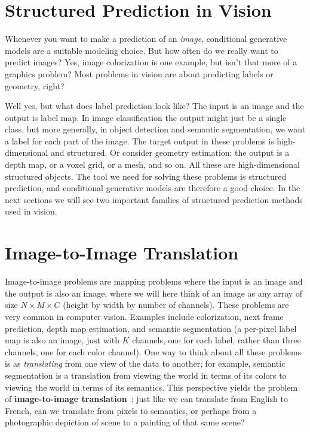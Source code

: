 \section{Structured Prediction in Vision}
Whenever you want to make a prediction of an \textit{image}, conditional generative models are a suitable modeling choice. But how often do we really want to predict images? Yes, image colorization is one example, but isn't that more of a graphics problem? Most problems in vision are about predicting labels or geometry, right?

Well yes, but what does label prediction look like? The input is an image and the output is label map. In image classification the output might just be a single class, but more generally, in object detection and semantic segmentation, we want a label for each part of the image. The target output in these problems is high-dimensional and structured. Or consider geometry estimation: the output is a depth map, or a voxel grid, or a mesh, and so on. All these are high-dimensional structured objects. The tool we need for solving these problems is structured prediction, and conditional generative models are therefore a good choice. In the next sections we will see two important families of structured prediction methods used in vision.

\section{Image-to-Image Translation}\label{sec:conditional_generative_models:im2im}

Image-to-image problems are mapping problems where the input is an image and the output is also an image, where we will here think of an image as any array of size $N \times M \times C$ (height by width by number of channels). These problems are very common in computer vision. Examples include colorization, next frame prediction, depth map estimation, and semantic segmentation (a per-pixel label map is also an image, just with $K$ channels, one for each label, rather than three channels, one for each color channel). One way to think about all these problems is as \textit{translating} from one view of the data to another; for example, semantic segmentation is a translation from viewing the world in terms of its colors to viewing the world in terms of its semantics. This perspective yields the problem of \textbf{image-to-image translation}~\cite{pix2pix2017}; just like we can translate from English to French, can we translate from pixels to semantics, or perhaps from a photographic depiction of scene to a painting of that same scene?


